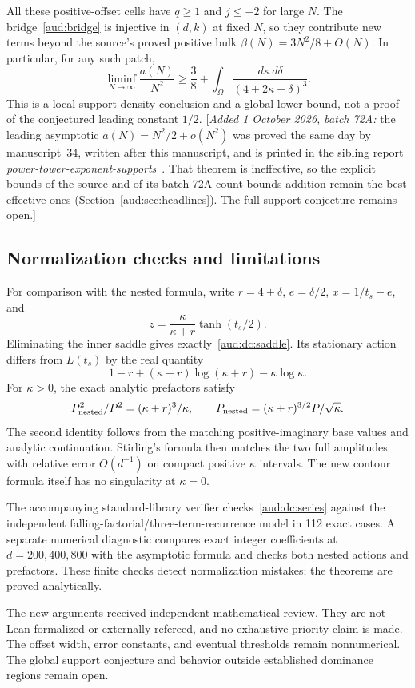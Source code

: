 \documentclass[11pt,a4paper]{article}
\numberwithin{equation}{section}
\newcommand{\addednote}[1]{{\small[\textit{Added 1 October 2026, batch 72A:} #1]}}
\begin{document}
All these positive-offset cells have $q\ge1$ and $j\le-2$ for large $N$. The bridge~\eqref{aud:bridge} is injective in $(d,k)$ at fixed $N$, so they contribute new terms beyond the source's proved positive bulk $\beta(N)=3N^2/8+O(N)$. In particular, for any such patch,
\[
 \liminf_{N\to\infty}\frac{a(N)}{N^2}
 \ge\frac38+\int_\Omega\frac{d\kappa\,d\delta}{(4+2\kappa+\delta)^3}.
\]
This is a local support-density conclusion and a global lower bound, not a proof of the conjectured leading constant $1/2$. \addednote{the leading asymptotic $a(N)=N^2/2+o(N^2)$ was proved the same day by manuscript~34, written after this manuscript, and is printed in the sibling report \emph{power-tower-exponent-supports}~\cite{pte}. That theorem is ineffective, so the explicit bounds of the source and of its batch-72A count-bounds addition remain the best effective ones (Section~\ref{aud:sec:headlines}). The full support conjecture remains open.}
\subsection{Normalization checks and limitations}
For comparison with the nested formula, write $r=4+\delta$, $e=\delta/2$, $x=1/t_s-e$, and
\[
 z=\frac\kappa{\kappa+r}\tanh(t_s/2).
\]
Eliminating the inner saddle gives exactly~\eqref{aud:dc:saddle}. Its stationary action differs from $L(t_s)$ by the real quantity
\[
 1-r+(\kappa+r)\log(\kappa+r)-\kappa\log\kappa.
\]
For $\kappa>0$, the exact analytic prefactors satisfy
\[
 P_{\rm nested}^2/P^2=(\kappa+r)^3/\kappa,
 \qquad P_{\rm nested}=(\kappa+r)^{3/2}P/\sqrt\kappa.
\]
The second identity follows from the matching positive-imaginary base values and analytic continuation. Stirling's formula then matches the two full amplitudes with relative error $O(d^{-1})$ on compact positive $\kappa$ intervals. The new contour formula itself has no singularity at $\kappa=0$.

The accompanying standard-library verifier checks~\eqref{aud:dc:series} against the independent falling-factorial/three-term-recurrence model in 112 exact cases. A separate numerical diagnostic compares exact integer coefficients at $d=200,400,800$ with the asymptotic formula and checks both nested actions and prefactors. These finite checks detect normalization mistakes; the theorems are proved analytically.

The new arguments received independent mathematical review. They are not Lean-formalized or externally refereed, and no exhaustive priority claim is made. The offset width, error constants, and eventual thresholds remain nonnumerical. The global support conjecture and behavior outside established dominance regions remain open.
\end{document}
